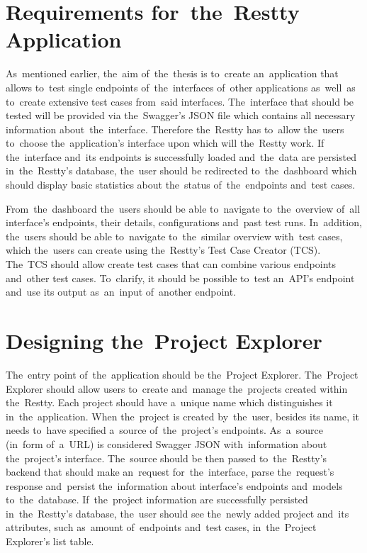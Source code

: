 \section{Requirements for~the~Restty Application}
As~mentioned earlier, the~aim of~the~thesis is to~create an~application that
allows to~test single endpoints of~the~interfaces of~other applications
as~well~as to~create extensive test cases from~said interfaces. The~interface
that should be tested will be provided via the~Swagger's JSON file which
contains all necessary information about~the~interface. Therefore the~Restty has
to~allow the~users to~choose the~application's interface upon which will
the~Restty work. If the~interface and~its endpoints is successfully loaded
and~the~data are persisted in~the~Restty's database, the~user should be
redirected to~the~dashboard which should display basic statistics about
the~status of~the~endpoints and~test cases.

From~the~dashboard the~users should be able to~navigate to~the~overview of~all
interface's endpoints, their details, configurations and~past test runs.
In~addition, the~users should be able to~navigate to~the~similar overview
with~test cases, which the~users can create using the~Restty's Test Case
Creator (TCS). The~TCS should allow create test cases that can combine various
endpoints and~other test cases. To~clarify, it should be possible to~test
an~API's endpoint and~use its output as~an~input of~another endpoint.


\section{Designing the~Project Explorer}
The~entry point of~the~application should be the~Project Explorer. The~Project
Explorer should allow users to~create and~manage the~projects created within
the~Restty. Each project should have a~unique name which distinguishes it
in~the~application. When the~project is created by~the~user, besides its name,
it needs to~have specified a~source of~the~project's endpoints. As~a~source
(in~form of~a~URL) is considered Swagger JSON with~information about
the~project's interface. The~source should be then passed to~the~Restty's
backend that should make an~request for~the~interface, parse the~request's
response and~persist the~information about interface's endpoints and~models
to~the~database. If~the~project information are successfully persisted
in~the~Restty's database, the~user should see the~newly added project and~its
attributes, such as~amount of~endpoints and~test cases, in~the~Project
Explorer's list table.

